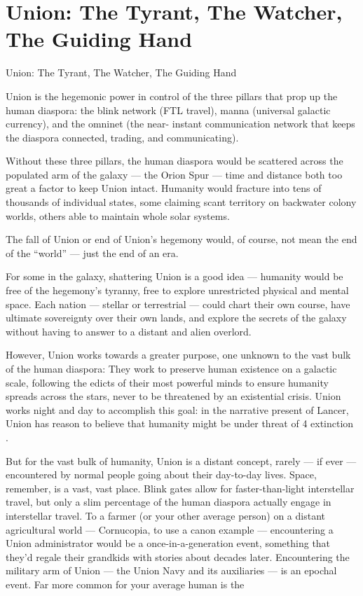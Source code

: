 \section{Union: The Tyrant, The Watcher, The Guiding Hand}

Union: The Tyrant, The Watcher, The  
Guiding Hand   

Union is the hegemonic power in control of the three pillars that prop up the human diaspora:  
the blink network (FTL travel), manna (universal galactic currency), and the omninet (the near- 
instant communication network that keeps the diaspora connected, trading, and  
communicating). 
 

Without these three pillars, the human diaspora would be scattered across the populated arm of  
the galaxy — the Orion Spur — time and distance both too great a factor to keep Union intact.  
Humanity would fracture into tens of thousands of individual states, some claiming scant territory  
on backwater colony worlds, others able to maintain whole solar systems.
 

The fall of Union or end of Union’s hegemony would, of course, not mean the end of the “world”  
— just the end of an era.
 

For some in the galaxy, shattering Union is a good idea — humanity would be free of the  
hegemony’s tyranny, free to explore unrestricted physical and mental space. Each nation —  
stellar or terrestrial — could chart their own course, have ultimate sovereignty over their own  
lands, and explore the secrets of the galaxy without having to answer to a distant and alien  
overlord.
 

However, Union works towards a greater purpose, one unknown to the vast bulk of the human  
diaspora: They work to preserve human existence on a galactic scale, following the edicts of  
their most powerful minds to ensure humanity spreads across the stars, never to be threatened  
by an existential crisis. Union works night and day to accomplish this goal: in the narrative  
present of Lancer, Union has reason to believe that humanity might be under threat of  
            4 
extinction  .  

But for the vast bulk of humanity, Union is a distant concept, rarely — if ever — encountered by  
normal people going about their day-to-day lives. Space, remember, is a vast, vast place. Blink  
gates allow for faster-than-light interstellar travel, but only a slim percentage of the human  
diaspora actually engage in interstellar travel. To a farmer (or your other average person) on a  
distant agricultural world — Cornucopia, to use a canon example — encountering a Union  
administrator would be a once-in-a-generation event, something that they’d regale their  
grandkids with stories about decades later. Encountering the military arm of Union — the Union  
Navy and its auxiliaries — is an epochal event. Far more common for your average human is the  

